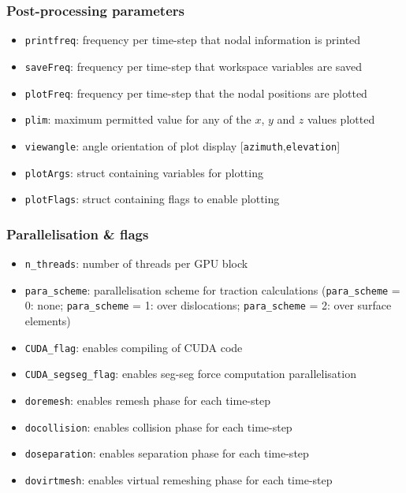 \documentclass[a4paper,12pt]{article}
\begin{document}
\subsubsection*{Post-processing parameters}

\begin{itemize}
  \item \texttt{printfreq}: frequency per time-step that nodal information is printed
  \item \texttt{saveFreq}: frequency per time-step that workspace variables are saved
  \item \texttt{plotFreq}: frequency per time-step that the nodal positions are plotted
  \item \texttt{plim}: maximum permitted value for any of the $x$, $y$ and $z$ values plotted
  \item \texttt{viewangle}: angle orientation of plot display [\texttt{azimuth},\texttt{elevation}]
  \item \texttt{plotArgs}: struct containing variables for plotting
  \item \texttt{plotFlags}: struct containing flags to enable plotting
\end{itemize}




\subsubsection*{Parallelisation \& flags}

\begin{itemize}
  \item \texttt{n\_threads}: number of threads per GPU block
  \item \texttt{para\_scheme}: parallelisation scheme for traction calculations (\texttt{para\_scheme} = 0: none; \texttt{para\_scheme} = 1: over dislocations; \texttt{para\_scheme} = 2: over surface elements)
  \item \texttt{CUDA\_flag}: enables compiling of CUDA code
  \item \texttt{CUDA\_segseg\_flag}: enables seg-seg force computation parallelisation
  \item \texttt{doremesh}: enables remesh phase for each time-step
  \item \texttt{docollision}: enables collision phase for each time-step
  \item \texttt{doseparation}: enables separation phase for each time-step
  \item \texttt{dovirtmesh}: enables virtual remeshing phase for each time-step
\end{itemize}
\end{document}
